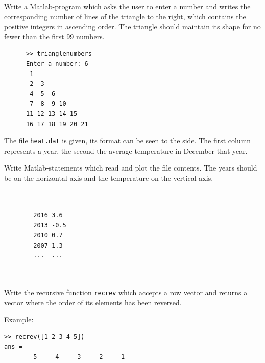 \documentclass[addpoints]{exam}
\begin{document}
\begin{questions}
\newpage

\question[10] 

\begin{multicols}{2}
Write a Matlab-program which asks the user to enter a number and writes the corresponding number of lines of the triangle to the right, which contains the positive integers in ascending order. The triangle should maintain its shape for no fewer than the first 99 numbers.
\begin{verbatim}
      >> trianglenumbers
      Enter a number: 6
       1 
       2  3 
       4  5  6 
       7  8  9 10 
      11 12 13 14 15 
      16 17 18 19 20 21
\end{verbatim}
\end{multicols}

\newpage

\question[10]

\begin{multicols}{2}
The file \texttt{heat.dat} is given, its format can be seen to the side. The first column represents a year, the second the average temperature in December that year.

Write Matlab-statements which read and plot the file contents. The years should be on the horizontal axis and the temperature on the vertical axis.

\begin{verbatim}
    
    
        2016 3.6
        2013 -0.5 
        2010 0.7
        2007 1.3
        ...  ...
    
    
\end{verbatim}
\end{multicols}


\newpage

\question[10] Write the recursive function \texttt{recrev} which accepts a row vector and returns a vector where the order of its elements has been reversed.

Example:
\begin{verbatim}
>> recrev([1 2 3 4 5])
ans =
        5     4     3     2     1
\end{verbatim}


\end{questions}
\end{document}
